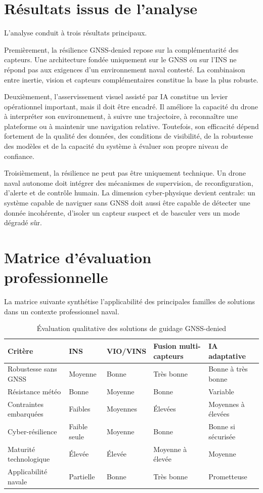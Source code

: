 \documentclass[12pt, a4paper, twoside, openright]{report}
\begin{document}
\section{Résultats issus de l’analyse}
L’analyse conduit à trois résultats principaux.

Premièrement, la résilience GNSS-denied repose sur la complémentarité des capteurs. Une architecture fondée uniquement sur le GNSS ou sur l’INS ne répond pas aux exigences d’un environnement naval contesté. La combinaison entre inertie, vision et capteurs complémentaires constitue la base la plus robuste.

Deuxièmement, l’asservissement visuel assisté par IA constitue un levier opérationnel important, mais il doit être encadré. Il améliore la capacité du drone à interpréter son environnement, à suivre une trajectoire, à reconnaître une plateforme ou à maintenir une navigation relative. Toutefois, son efficacité dépend fortement de la qualité des données, des conditions de visibilité, de la robustesse des modèles et de la capacité du système à évaluer son propre niveau de confiance.

Troisièmement, la résilience ne peut pas être uniquement technique. Un drone naval autonome doit intégrer des mécanismes de supervision, de reconfiguration, d’alerte et de contrôle humain. La dimension cyber-physique devient centrale: un système capable de naviguer sans GNSS doit aussi être capable de détecter une donnée incohérente, d’isoler un capteur suspect et de basculer vers un mode dégradé sûr.

\section{Matrice d’évaluation professionnelle}
La matrice suivante synthétise l’applicabilité des principales familles de solutions dans un contexte professionnel naval.

\begin{table}[H]
\centering
\caption{Évaluation qualitative des solutions de guidage GNSS-denied}
\begin{tabularx}{\textwidth}{lXXXX}
\toprule
\textbf{Critère} & \textbf{INS} & \textbf{VIO/VINS} & \textbf{Fusion multi-capteurs} & \textbf{IA adaptative} \\
\midrule
Robustesse sans GNSS & Moyenne & Bonne & Très bonne & Bonne à très bonne \\
Résistance météo & Bonne & Moyenne & Bonne & Variable \\
Contraintes embarquées & Faibles & Moyennes & Élevées & Moyennes à élevées \\
Cyber-résilience & Faible seule & Moyenne & Bonne & Bonne si sécurisée \\
Maturité technologique & Élevée & Élevée & Moyenne à élevée & Moyenne \\
Applicabilité navale & Partielle & Bonne & Très bonne & Prometteuse \\
\bottomrule
\end{tabularx}
\end{table}
\end{document}
